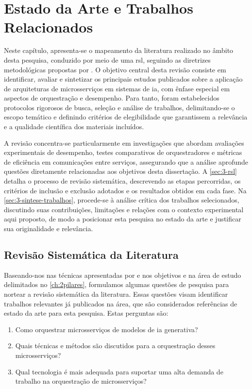 \chapter{Estado da Arte e Trabalhos Relacionados}
\label{ch:3estado_da_arte}

Neste capítulo, apresenta-se o mapeamento da literatura realizado no âmbito desta pesquisa, conduzido por meio de uma \acrfull{rsl}, seguindo as diretrizes metodológicas propostas por \textcite{scannavino_revisao_2017}. O objetivo central desta revisão consiste em identificar, avaliar e sintetizar os principais estudos publicados sobre a aplicação de arquiteturas de microsserviços em sistemas de \acrfull{ia}, com ênfase especial em aspectos de orquestração e desempenho. Para tanto, foram estabelecidos protocolos rigorosos de busca, seleção e análise de trabalhos, delimitando-se o escopo temático e definindo critérios de elegibilidade que garantissem a relevância e a qualidade científica dos materiais incluídos.

A revisão concentra-se particularmente em investigações que abordam avaliações experimentais de desempenho, testes comparativos de orquestradores e métricas de eficiência em comunicações entre serviços, assegurando que a análise aprofunde questões diretamente relacionadas aos objetivos desta dissertação. A \autoref{sec:3-rsl} detalha o processo de revisão sistemática, descrevendo as etapas percorridas, os critérios de inclusão e exclusão adotados e os resultados obtidos em cada fase. Na \autoref{sec:3-sintese-trabalhos}, procede-se à análise crítica dos trabalhos selecionados, discutindo suas contribuições, limitações e relações com o contexto experimental aqui proposto, de modo a posicionar esta pesquisa no estado da arte e justificar sua originalidade e relevância.

\section{Revisão Sistemática da Literatura}
\label{sec:3-rsl}

Baseando-nos nas técnicas apresentadas por \textcite{scannavino_revisao_2017} e nos objetivos e na área de estudo delimitados no \autoref{ch:2pilares}, formulamos algumas questões de pesquisa para nortear a revisão sistemática da literatura. Essas questões visam identificar trabalhos relevantes já publicados na área, que são considerados referências de estado da arte para esta pesquisa. Estas perguntas são:

\begin{enumerate}
    \item  Como orquestrar microsserviços de modelos de \gls{ia} generativa?
    \item  Quais técnicas e métodos são discutidos para a orquestração desses microsserviços?
    \item  Qual tecnologia é mais adequada para suportar uma alta demanda de trabalho na orquestração de microsserviços?
\end{enumerate}


